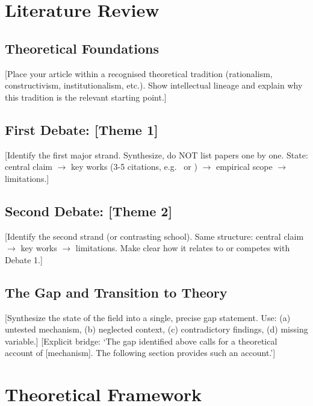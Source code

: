 \documentclass[12pt,a4paper]{article}
\begin{document}
\section{Literature Review}\label{sec:lit} %

\subsection{Theoretical Foundations} %
[Place your article within a recognised theoretical tradition (rationalism, constructivism, institutionalism, etc.). Show intellectual lineage and explain why this tradition is the relevant starting point.]

\subsection{First Debate: [Theme 1]} %
[Identify the first major strand. Synthesize, do NOT list papers one by one. State: central claim $\rightarrow$ key works (3-5 citations, e.g.\ \citet{author2020} or \citep{author2020}) $\rightarrow$ empirical scope $\rightarrow$ limitations.]

\subsection{Second Debate: [Theme 2]} %
[Identify the second strand (or contrasting school). Same structure: central claim $\rightarrow$ key works $\rightarrow$ limitations. Make clear how it relates to or competes with Debate 1.]

\subsection{The Gap and Transition to Theory} %
[Synthesize the state of the field into a single, precise gap statement. Use: (a) untested mechanism, (b) neglected context, (c) contradictory findings, (d) missing variable.]
[Explicit bridge: `The gap identified above calls for a theoretical account of [mechanism]. The following section provides such an account.']

\section{Theoretical Framework}\label{sec:theory} %
\end{document}

